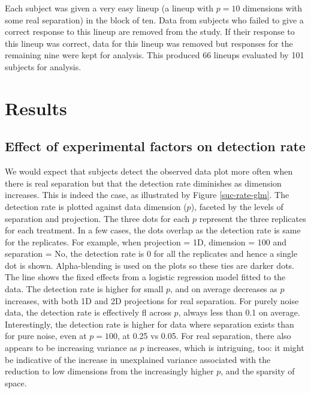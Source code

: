 
Each subject was given a very easy lineup (a lineup with $p = 10$ dimensions with some real separation) in the block of ten. Data from subjects who failed to give a correct response to this lineup are removed from the study. If their response to this lineup was correct, data for this lineup was removed but responses for the remaining nine were kept for analysis. This produced 66 lineups evaluated by 101 subjects for analysis.


\section{Results} \label{sec:results}

\subsection{Effect of experimental factors on detection rate} \label{effects}

We would expect that subjects detect the observed data plot more often when there is real separation but that the detection rate diminishes as dimension increases. This is indeed the case, as illustrated by Figure \ref{suc-rate-glm}. The detection rate is plotted against data dimension ($p$), faceted by the levels of separation and projection. The three dots for each $p$ represent the three replicates for each treatment. In a few cases, the dots overlap as the detection rate is same for the replicates. For example, when projection = 1D, dimension = 100 and separation = No, the detection rate is 0 for all the replicates and hence a single dot is shown. Alpha-blending is used on the plots so these ties are darker dots. The line shows the fixed effects from a logistic regression model fitted to the data. The detection rate is higher for small $p$, and on average decreases as $p$ increases, with both 1D and 2D projections for real separation. For purely noise data, the detection rate is effectively fl across $p$, always less than 0.1 on average. Interestingly, the detection rate is higher for data where separation exists than for pure noise, even at $p = 100$, at 0.25 vs 0.05. For real separation, there also appears to be increasing variance as $p$ increases, which is intriguing, too: it might be indicative of the increase in unexplained variance associated with the reduction to low dimensions from the increasingly higher $p$, and the sparsity of space.

